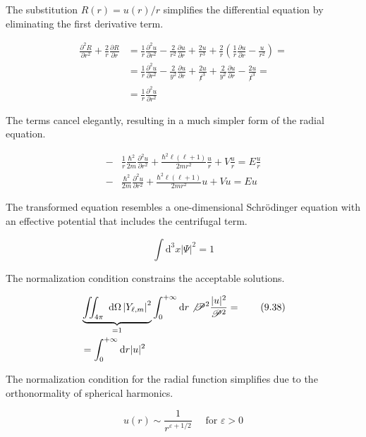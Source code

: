 \documentclass[10pt]{article}
\begin{document}
The substitution $R(r) = u(r)/r$ simplifies the differential equation by eliminating the first derivative term.

\begin{align*}
\frac{\partial^{2} R}{\partial r^{2}}+\frac{2}{r} \frac{\partial R}{\partial r} & =\frac{1}{r} \frac{\partial^{2} u}{\partial r^{2}}-\frac{2}{r^{2}} \frac{\partial u}{\partial r}+\frac{2 u}{r^{3}}+\frac{2}{r}\left(\frac{1}{r} \frac{\partial u}{\partial r}-\frac{u}{r^{2}}\right)= \\
& =\frac{1}{r} \frac{\partial^{2} u}{\partial r^{2}}-\frac{2}{y^{2}} \frac{\partial u}{\partial r}+\frac{2 u}{\not r^{3}}+\frac{2}{y^{2}} \frac{\partial u}{\partial r}-\frac{2 u}{\not r^{3}}=  \tag{9.35}\\
& =\frac{1}{r} \frac{\partial^{2} u}{\partial r^{2}}
\end{align*}

The terms cancel elegantly, resulting in a much simpler form of the radial equation.

\begin{align*}
- & \frac{1}{r} \frac{\hbar^{2}}{2 m} \frac{\partial^{2} u}{\partial r^{2}}+\frac{\hbar^{2} \ell(\ell+1)}{2 m r^{2}} \frac{u}{r}+V \frac{u}{r}=E \frac{u}{r}  \tag{9.36}\\
- & \frac{\hbar^{2}}{2 m} \frac{\partial^{2} u}{\partial r^{2}}+\frac{\hbar^{2} \ell(\ell+1)}{2 m r^{2}} u+V u=E u
\end{align*}

The transformed equation resembles a one-dimensional Schrödinger equation with an effective potential that includes the centrifugal term.

\begin{equation*}
\int \mathrm{d}^{3} x|\Psi|^{2}=1 \tag{9.37}
\end{equation*}

The normalization condition constrains the acceptable solutions.

\begin{align*}
& \underbrace{\iint_{4 \pi} \mathrm{~d} \Omega\left|Y_{\ell, m}\right|^{2}}_{=1} \int_{0}^{+\infty} \mathrm{d} r \not \mathscr{P}^{2} \frac{|u|^{2}}{\mathscr{P}^{2}}=  \tag{9.38}\\
& =\int_{0}^{+\infty} \mathrm{d} r|u|^{2}
\end{align*}

The normalization condition for the radial function simplifies due to the orthonormality of spherical harmonics.

\begin{equation*}
u(r) \sim \frac{1}{r^{\varepsilon+1 / 2}} \quad \text { for } \varepsilon>0 \tag{9.39}
\end{equation*}
\end{document}
